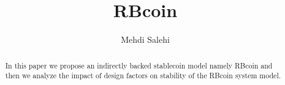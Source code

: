 \documentclass[conference, anonymous]{IEEEtran}
\begin{document}


\title{RBcoin}

\author{
Mehdi Salehi
}

\maketitle

\begin{abstract}
In this paper we propose an indirectly backed stablecoin model namely RBcoin and then we analyze the impact of design factors on stability of the RBcoin system model.
\end{abstract}




%
%
%
%




%
%
\end{document}
